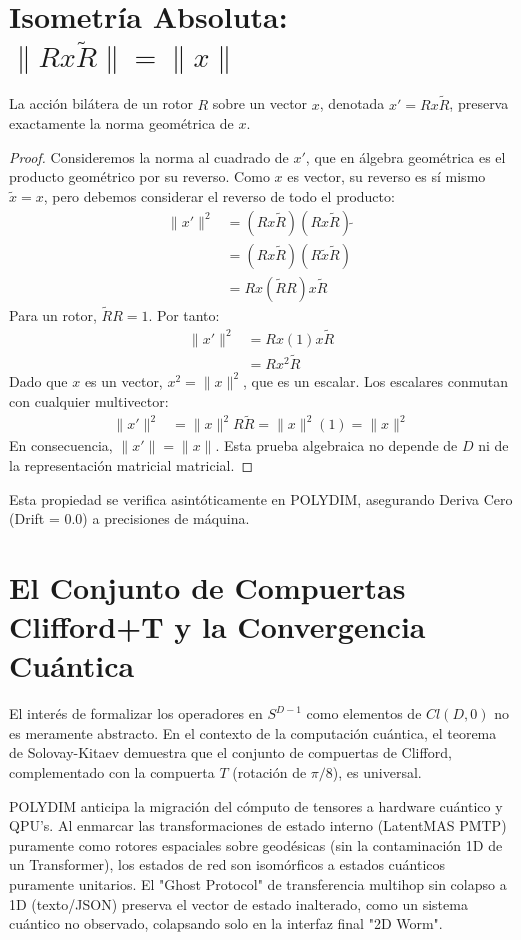 \section{Isometría Absoluta: $\|R x \tilde{R}\| = \|x\|$}
\begin{theorem}
La acción bilátera de un rotor $R$ sobre un vector $x$, denotada $x' = R x \tilde{R}$, preserva exactamente la norma geométrica de $x$.
\end{theorem}
\begin{proof}
Consideremos la norma al cuadrado de $x'$, que en álgebra geométrica es el producto geométrico por su reverso. Como $x$ es vector, su reverso es sí mismo $\tilde{x} = x$, pero debemos considerar el reverso de todo el producto:
\begin{align*}
    \|x'\|^2 &= (R x \tilde{R}) (R x \tilde{R})\tilde{\ } \\
             &= (R x \tilde{R}) (R \tilde{x} \tilde{R}) \\
             &= R x (\tilde{R} R) x \tilde{R}
\end{align*}
Para un rotor, $\tilde{R} R = 1$. Por tanto:
\begin{align*}
    \|x'\|^2 &= R x (1) x \tilde{R} \\
             &= R x^2 \tilde{R}
\end{align*}
Dado que $x$ es un vector, $x^2 = \|x\|^2$, que es un escalar. Los escalares conmutan con cualquier multivector:
\begin{align*}
    \|x'\|^2 &= \|x\|^2 R \tilde{R} = \|x\|^2 (1) = \|x\|^2
\end{align*}
En consecuencia, $\|x'\| = \|x\|$. Esta prueba algebraica no depende de $D$ ni de la representación matricial matricial.
\end{proof}
Esta propiedad se verifica asintóticamente en POLYDIM, asegurando Deriva Cero (Drift = 0.0) a precisiones de máquina.

\section{El Conjunto de Compuertas Clifford+T y la Convergencia Cuántica}
El interés de formalizar los operadores en $S^{D-1}$ como elementos de $Cl(D,0)$ no es meramente abstracto. En el contexto de la computación cuántica, el teorema de Solovay-Kitaev demuestra que el conjunto de compuertas de Clifford, complementado con la compuerta $T$ (rotación de $\pi/8$), es universal.

POLYDIM anticipa la migración del cómputo de tensores a hardware cuántico y QPU's. Al enmarcar las transformaciones de estado interno (LatentMAS PMTP) puramente como rotores espaciales sobre geodésicas (sin la contaminación 1D de un Transformer), los estados de red son isomórficos a estados cuánticos puramente unitarios. El "Ghost Protocol" de transferencia multihop sin colapso a 1D (texto/JSON) preserva el vector de estado inalterado, como un sistema cuántico no observado, colapsando solo en la interfaz final "2D Worm".

